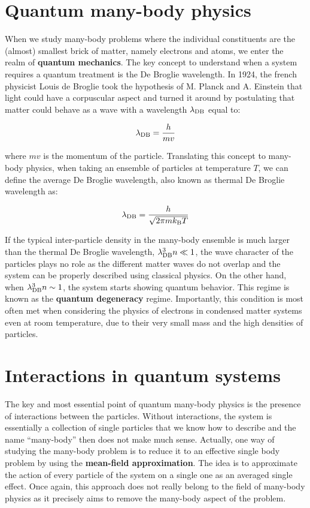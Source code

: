 \section*{Quantum many-body physics}

When we study many-body problems where the individual constituents are the (almost) smallest brick of matter, namely electrons and atoms, we enter the realm of \textbf{quantum mechanics}. The key concept to understand when a system requires a quantum treatment is the De Broglie wavelength. In 1924, the french physicist Louis de Broglie took the hypothesis of M. Planck and A. Einstein that light could have a corpuscular aspect and turned it around by postulating that matter could behave as a wave with a wavelength $\lambda_{\rm{DB}}$ equal to:

\begin{equation}
    \lambda_{\rm{DB}} = \frac{h}{mv}
\end{equation}

\noindent where $mv$ is the momentum of the particle. Translating this concept to many-body physics, when taking an ensemble of particles at temperature $T$, we can define the average De Broglie wavelength, also known as thermal De Broglie wavelength as:

\begin{equation}
    \lambda_{\rm{DB}} = \frac{h}{\sqrt{2 \pi m k_{\mathrm{B}} T}}
\end{equation}

\noindent If the typical inter-particle density in the many-body ensemble is much larger than the thermal De Broglie wavelength, \ie $\lambda_{\rm{DB}}^3 n \ll 1$, the wave character of the particles plays no role as the different matter waves do not overlap and the system can be properly described using classical physics. On the other hand, when $\lambda_{\rm{DB}}^3 n \sim 1$, the system starts showing quantum behavior. This regime is known as the \textbf{quantum degeneracy} regime. Importantly, this condition is most often met when considering the physics of electrons in condensed matter systems even at room temperature, due to their very small mass and the high densities of particles.

\section*{Interactions in quantum systems}

The key and most essential point of quantum many-body physics is the presence of interactions between the particles. Without interactions, the system is essentially a collection of single particles that we know how to describe and the name ``many-body'' then does not make much sense. Actually, one way of studying the many-body problem is to reduce it to an effective single body problem by using the \textbf{mean-field approximation}. The idea is to approximate the action of every particle of the system on a single one as an averaged single effect. Once again, this approach does not really belong to the field of many-body physics as it precisely aims to remove the many-body aspect of the problem.

